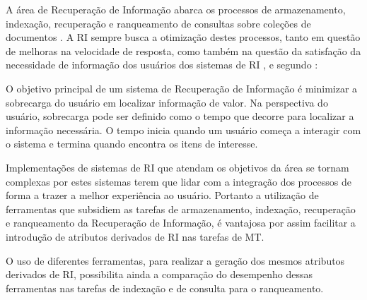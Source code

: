     
    A área de Recuperação de Informação abarca os processos de armazenamento, indexação, recuperação e ranqueamento de consultas sobre coleções de documentos \cite[p.~5--8]{Baeza-Yates2011}.
    A RI sempre busca a otimização destes processos, tanto em questão de melhoras na velocidade de resposta, como também na questão da satisfação da necessidade de informação dos usuários dos sistemas de RI \cite[p~.671--672]{Sammut2017EMLDM}, e segundo :
    
    \begin{citacao}
        O objetivo principal de um sistema de Recuperação de Informação é minimizar a sobrecarga do usuário em localizar informação de valor. 
        Na perspectiva do usuário, sobrecarga pode ser definido como o tempo que decorre para localizar a informação necessária.
        O tempo inicia quando um usuário começa a interagir com o sistema e termina quando encontra os itens de interesse.
    \end{citacao}
    Implementações de sistemas de RI que atendam os objetivos da área se tornam complexas por estes sistemas terem que lidar com a integração dos processos de forma a trazer a melhor experiência ao usuário.
    Portanto a utilização de ferramentas que subsidiem as tarefas de armazenamento, indexação, recuperação e ranqueamento da Recuperação de Informação, é vantajosa por assim facilitar a introdução de atributos derivados de RI nas tarefas de MT.
   
    O uso de diferentes ferramentas, para realizar a geração dos mesmos atributos derivados de RI, possibilita ainda a comparação do desempenho dessas ferramentas nas tarefas de indexação e de consulta para o ranqueamento.
    
